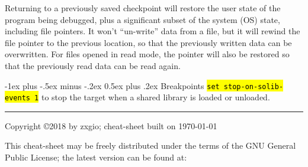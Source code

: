 \documentclass[a4paper,landscape]{article}
\makeatletter
\renewcommand{\section}{\@startsection{section}{1}{0mm}%
                                {-1ex plus -.5ex minus -.2ex}%
                                {0.5ex plus .2ex}%
                                {\normalfont\large\bfseries}}
\makeatother
\begin{document}
\begin{multicols*}{3}
Returning to a previously saved checkpoint will restore the user state of the program
being debugged, plus a significant subset of the system (OS) state, including file pointers. It
won't ``un-write'' data from a file, but it will rewind the file pointer to the previous location,
so that the previously written data can be overwritten. For files opened in read mode, the
pointer will also be restored so that the previously read data can be read again.

\section{Breakpoints}
\hl{\texttt{set stop-on-solib-events 1}} to stop the target when a shared library is loaded or unloaded.

\rule{1.0\linewidth}{0.25pt}
\scriptsize
Copyright \copyright 2018 by zxgio; cheat-sheet built on \today

This cheat-sheet may be freely distributed under the terms of the GNU
General Public License; the latest version can be found at: \\
\end{multicols*}
\end{document}

